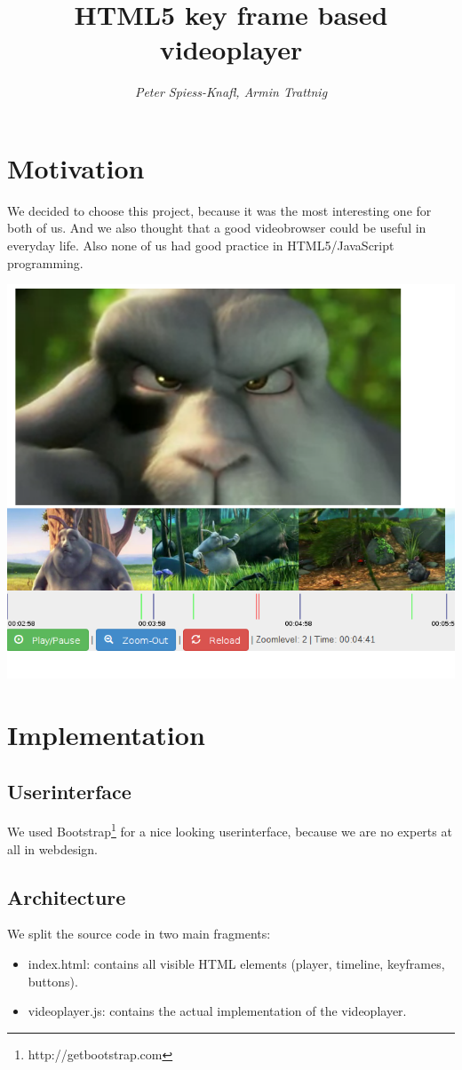 \documentclass[11pt]{scrartcl}
\title{\textbf{HTML5 key frame based videoplayer}}
\author{\emph{Peter Spiess-Knafl, Armin Trattnig}}
\begin{document}
\date{}
\maketitle

\section{Motivation}
We decided to choose this project, because it was the most interesting one for both of us. And we also thought that a good videobrowser could be useful in everyday life. Also none of us had good practice in HTML5/JavaScript programming.

\begin{center}\includegraphics[scale=0.5]{screenshot}\end{center}

\section{Implementation}

\subsection{Userinterface}
We used Bootstrap\footnote{http://getbootstrap.com} for a nice looking userinterface, because we are no experts at all in webdesign.

\subsection{Architecture}
We split the source code in two main fragments:
\begin{itemize}
\item index.html: contains all visible HTML elements (player, timeline, keyframes, buttons).
\item videoplayer.js: contains the actual implementation of the videoplayer.
\end{itemize}
\end{document}
